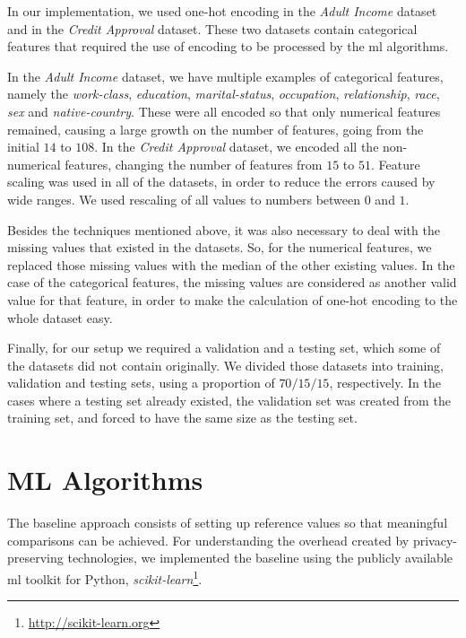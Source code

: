 In our implementation, we used one-hot encoding in the \emph{Adult Income} dataset and in the \emph{Credit Approval} dataset. These two datasets contain categorical features that required the use of encoding to be processed by the \ac{ml} algorithms.

In the \emph{Adult Income} dataset, we have multiple examples of categorical features, namely the \textit{work-class}, \textit{education}, \textit{marital-status}, \textit{occupation}, \textit{relationship}, \textit{race}, \textit{sex} and \textit{native-country}. These were all encoded so that only numerical features remained, causing a large growth on the number of features, going from the initial $14$ to $108$.
In the \emph{Credit Approval} dataset, we encoded all the non-numerical features, changing the number of features from $15$ to $51$.
Feature scaling was used in all of the datasets, in order to reduce the errors caused by wide ranges. We used rescaling of all values to numbers between $0$ and $1$.

Besides the techniques mentioned above, it was also necessary to deal with the missing values that existed in the datasets. So, for the numerical features, we replaced those missing values with the median of the other existing values. In the case of the categorical features, the missing values are considered as another valid value for that feature, in order to make the calculation of one-hot encoding to the whole dataset easy. 

Finally, for our setup we required a validation and a testing set, which some of the datasets did not contain originally. We divided those datasets into training, validation and testing sets, using a proportion of $70/15/15$, respectively. In the cases where a testing set already existed, the validation set was created from the training set, and forced to have the same size as the testing set.


\section{ML Algorithms}
\label{sec:BaselineImplementation}

The baseline approach consists of setting up reference values so that meaningful comparisons can be achieved. For understanding the overhead created by privacy-preserving technologies, we implemented the baseline using the publicly available \ac{ml} toolkit for Python, \textit{scikit-learn}\footnote{\url{http://scikit-learn.org}}.

